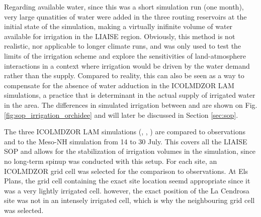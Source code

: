Regarding available water, since this was a short simulation run (one month), very large qunatities of water were added in the three routing reservoirs at the initial state of the simulation, making a virtually inifinite volume of water available for irrigation in the LIAISE region. Obviously, this method is not realistic, nor applicable to longer climate runs, and was only used to test the limits of the irrigation scheme and explore the sensitivities of land-atmosphere interactions in a context where irrigation would be driven by the water demand rather than the supply. 
Compared to reality, this can also be seen as a way to compensate for the absence of water adduction in the ICOLMDZOR LAM simulations, a practice that is determinant in the actual supply of irrigated water in the area. 
The differences in simulated irrigation between \irr and \noirr are shown on Fig. \ref{fig:sop_irrigation_orchidee} and will later be discussed in Section \ref{sec:sop}.

\hfill

The three ICOLMDZOR LAM simulations (\noirr, \irr, \irrboost) are compared to observations and to the Meso-NH simulation from 14 to 30 July. This covers all the LIAISE SOP and allows for the stabilization of irrigation volumes in the \irrboost simulation, since no long-term spinup was conducted with this setup.
For each site, an ICOLMDZOR grid cell was selected for the comparison to observations. At Els Plans, the grid cell containing the exact site location seemd appropriate since it was a very lightly irrigated cell. however, the exact position of the La Cendrosa site was not in an intensely irrigated cell, which is why the neighbouring grid cell was selected.

